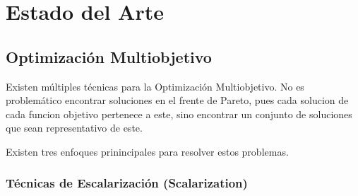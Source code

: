 \chapter{Estado del Arte}\label{chapter:state-of-the-art}

\section{Optimizaci\'on Multiobjetivo}

Existen m\'ultiples t\'ecnicas para la Optimizaci\'on Multiobjetivo. No es problem\'atico encontrar soluciones en el frente de Pareto, pues cada solucion de cada funcion objetivo pertenece a este, sino encontrar un conjunto de soluciones que sean representativo de este.

Existen tres enfoques prinincipales para resolver estos problemas.

\subsection*{T\'ecnicas de Escalarizaci\'on (Scalarization)}

